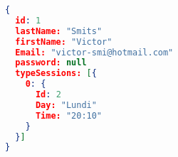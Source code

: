 \begin{lstlisting}[language=json,firstnumber=1]
{
  id: 1
  lastName: "Smits"
  firstName: "Victor"
  Email: "victor-smi@hotmail.com"
  password: null
  typeSessions: [{
    0: {
      Id: 2
      Day: "Lundi"
      Time: "20:10"
    }
  }]
}
\end{lstlisting}